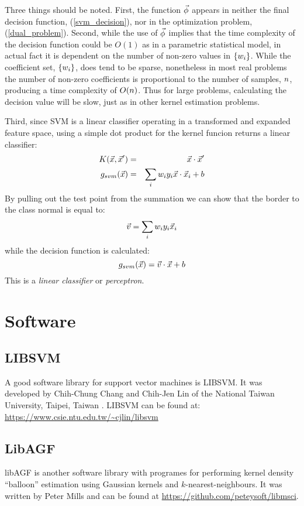 \documentclass{article}
\begin{document}
Three things should be noted. First, the function $\vec\phi$ appears in
neither the final decision function, (\ref{svm_decision}), nor in the
optimization problem, (\ref{dual_problem}). Second, while the use of
$\vec\phi$ implies that the time complexity of the decision function 
could be $O(1)$ as in a parametric statistical model, in actual fact it is
dependent on the number of non-zero values in $\lbrace w_i \rbrace$.
While the coefficient set, $\lbrace w_i \rbrace$, does tend to be sparse,
nonetheless in most real problems the number of non-zero coefficients is
proportional to the number of samples, $n$, producing a time complexity
of $O(n)$. Thus for large problems, calculating the decision value will
be slow, just as in other kernel estimation problems.

Third, since SVM is a linear classifier operating in a transformed and expanded
feature space, using a simple dot product for the kernel funcion returns a linear classifier:
\begin{eqnarray}
	K(\vec {x}, \vec {x}^\prime) & = & \vec {x} \cdot \vec {x}^\prime \\
	g_{svm}(\vec {x}) & = & \sum_i w_i y_i \vec {x} \cdot \vec {x}_i + b
\end{eqnarray}
By pulling out the test point from the summation we can show that the border
to the class normal is equal to:
\begin{equation}
	\vec v = \sum_i w_i y_i \vec {x}_i
\end{equation}
while the decision function is calculated:
\begin{equation}
	g_{svm}(\vec {x})=\vec v \cdot \vec {x} + b
\end{equation}
This is a {\it linear classifier} or {\it perceptron}.
	
\section{Software}

\label{methods}

\subsection{LIBSVM}

A good software library for support vector machines is LIBSVM. 
It was developed by Chih-Chung Chang and Chih-Jen Lin of 
the National Taiwan University, Taipei, Taiwan \citep{Chang_Lin2011}.
LIBSVM can be found at: \url{https://www.csie.ntu.edu.tw/~cjlin/libsvm}

\subsection{LibAGF}

libAGF is another software library with programes for performing kernel
density ``balloon'' estimation using Gaussian kernels and $k$-nearest-neighbours\citep{Mills2011}.
It was written by Peter Mills and can be found at
\url{https://github.com/peteysoft/libmsci}.


\end{document}
